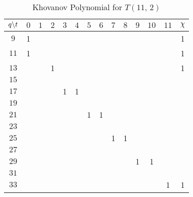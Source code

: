     \begin{table}
        \centering
        \begin{tabular}{| c | c | c | c | c | c | c | c | c | c | c | c | c | c |}
            \hline
            $q\symbol{92}t$&$0$&$1$&$2$&$3$&$4$&$5$&$6$&$7$&$8$&$9$&$10$&$11$&$\chi$\\
            \hline
            $9$&1&&&&&&&&&&&&1\\
            \hline
            $11$&1&&&&&&&&&&&&1\\
            \hline
            $13$&&&1&&&&&&&&&&1\\
            \hline
            $15$&&&&&&&&&&&&&\\
            \hline
            $17$&&&&1&1&&&&&&&&\\
            \hline
            $19$&&&&&&&&&&&&&\\
            \hline
            $21$&&&&&&1&1&&&&&&\\
            \hline
            $23$&&&&&&&&&&&&&\\
            \hline
            $25$&&&&&&&&1&1&&&&\\
            \hline
            $27$&&&&&&&&&&&&&\\
            \hline
            $29$&&&&&&&&&&1&1&&\\
            \hline
            $31$&&&&&&&&&&&&&\\
            \hline
            $33$&&&&&&&&&&&&1&1\\
            \hline
        \end{tabular}
        \caption{Khovanov Polynomial for $T(11,\,2)$}
        \label{table:t_2_11_kho}
    \end{table}
